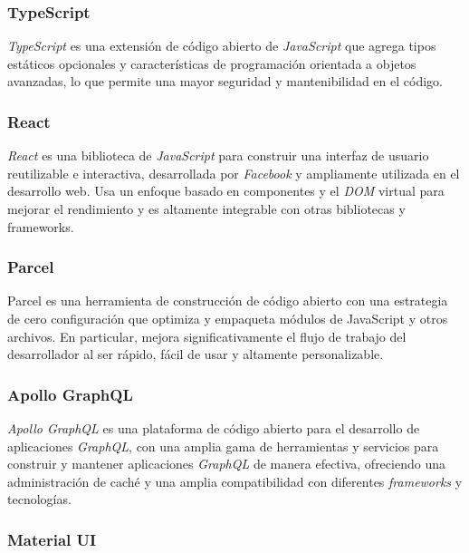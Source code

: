 \subsubsection{TypeScript}

\textit{TypeScript} \citep{typescript} es una extensión de código abierto de \textit{JavaScript} que agrega tipos estáticos opcionales y características de programación orientada a objetos avanzadas, lo que permite una mayor seguridad y mantenibilidad en el código. 


\subsubsection{React}

\textit{React} \citep{react} es una biblioteca de \textit{JavaScript} para construir una interfaz de usuario reutilizable e interactiva, desarrollada por \textit{Facebook} y ampliamente utilizada en el desarrollo web. Usa un enfoque basado en componentes y el \textit{DOM} virtual para mejorar el rendimiento y es altamente integrable con otras bibliotecas y frameworks.


\subsubsection{Parcel}

Parcel \citep{parcel} es una herramienta de construcción de código abierto con una estrategia de cero configuración que optimiza y empaqueta módulos de JavaScript y otros archivos. En particular, mejora significativamente el flujo de trabajo del desarrollador al ser rápido, fácil de usar y altamente personalizable.


\subsubsection{Apollo GraphQL}

\textit{Apollo GraphQL} \citep{apollo-graphql} es una plataforma de código abierto para el desarrollo de aplicaciones \textit{GraphQL}, con una amplia gama de herramientas y servicios para construir y mantener aplicaciones \textit{GraphQL} de manera efectiva, ofreciendo una administración de caché y una amplia compatibilidad con diferentes \textit{frameworks} y tecnologías.


\subsubsection{Material UI}

